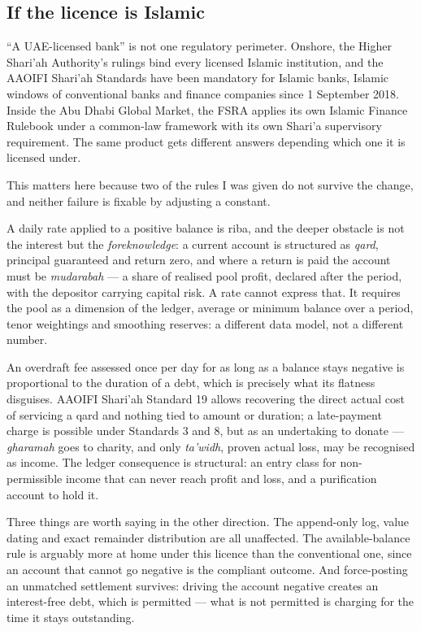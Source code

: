 \documentclass[10pt,a4paper]{article}
\newcommand{\term}[1]{\textit{#1}}
\begin{document}
\subsection{If the licence is Islamic}

``A UAE-licensed bank'' is not one regulatory perimeter. Onshore, the Higher
Shari'ah Authority's rulings bind every licensed Islamic institution, and the
AAOIFI Shari'ah Standards have been mandatory for Islamic banks, Islamic
windows of conventional banks and finance companies since 1 September 2018.
Inside the Abu Dhabi Global Market, the FSRA applies its own Islamic Finance
Rulebook under a common-law framework with its own Shari'a supervisory
requirement. The same product gets different answers depending which one it is
licensed under.

This matters here because two of the rules I was given do not survive the
change, and neither failure is fixable by adjusting a constant.

A daily rate applied to a positive balance is riba, and the deeper obstacle is
not the interest but the \term{foreknowledge}: a current account is structured
as \term{qard}, principal guaranteed and return zero, and where a return is
paid the account must be \term{mudarabah} --- a share of realised pool profit,
declared after the period, with the depositor carrying capital risk. A rate
cannot express that. It requires the pool as a dimension of the ledger, average
or minimum balance over a period, tenor weightings and smoothing reserves: a
different data model, not a different number.

An overdraft fee assessed once per day for as long as a balance stays negative
is proportional to the duration of a debt, which is precisely what its flatness
disguises. AAOIFI Shari'ah Standard 19 allows recovering the direct actual cost
of servicing a qard and nothing tied to amount or duration; a late-payment
charge is possible under Standards 3 and 8, but as an undertaking to donate ---
\term{gharamah} goes to charity, and only \term{ta'widh}, proven actual loss,
may be recognised as income. The ledger consequence is structural: an entry
class for non-permissible income that can never reach profit and loss, and a
purification account to hold it.

Three things are worth saying in the other direction. The append-only log,
value dating and exact remainder distribution are all unaffected. The
available-balance rule is arguably more at home under this licence than the
conventional one, since an account that cannot go negative is the compliant
outcome. And force-posting an unmatched settlement survives: driving the
account negative creates an interest-free debt, which is permitted --- what is
not permitted is charging for the time it stays outstanding.
\end{document}
